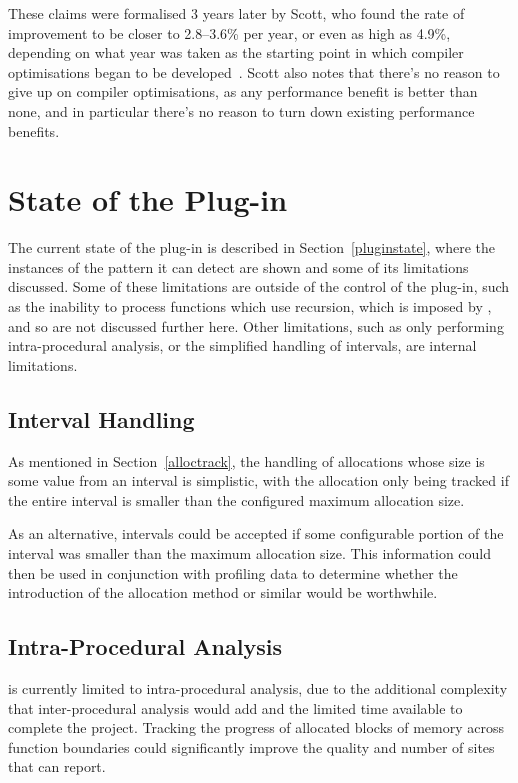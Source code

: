 These claims were formalised 3 years later by Scott, who found the rate of improvement to be closer to 2.8–3.6\% per year, or even as high as 4.9\%, depending on what year was taken as the starting point in which compiler optimisations began to be developed~\cite{proebstingformal}. Scott also notes that there's no reason to give up on compiler optimisations, as any performance benefit is better than none, and in particular there's no reason to turn down existing performance benefits.

\section{State of the Plug-in}

The current state of the  plug-in is described in Section~\ref{pluginstate}, where the instances of the pattern it can detect are shown and some of its limitations discussed. Some of these limitations are outside of the control of the plug-in, such as the inability to process functions which use recursion, which is imposed by , and so are not discussed further here. Other limitations, such as only performing intra-procedural analysis, or the simplified handling of intervals, are internal limitations.

\subsection{Interval Handling}

As mentioned in Section~\ref{alloctrack}, the handling of allocations whose size is some value from an interval is simplistic, with the allocation only being tracked if the entire interval is smaller than the configured maximum allocation size.

As an alternative, intervals could be accepted if some configurable portion of the interval was smaller than the maximum allocation size. This information could then be used in conjunction with profiling data to determine whether the introduction of the  allocation method or similar would be worthwhile.

\subsection{Intra-Procedural Analysis}

 is currently limited to intra-procedural analysis, due to the additional complexity that inter-procedural analysis would add and the limited time available to complete the project. Tracking the progress of allocated blocks of memory across function boundaries could significantly improve the quality and number of sites that  can report.

